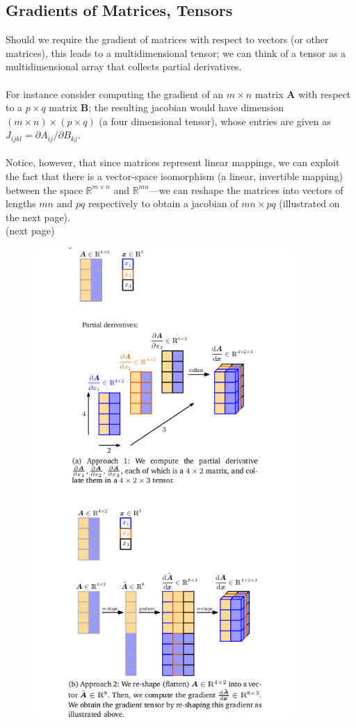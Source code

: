 \documentclass{report}
\begin{document}
\subsection{Gradients of Matrices, Tensors}%
Should we require the gradient of matrices with respect to vectors (or other matrices), this leads to a multidimensional
tensor; we can think of a tensor as a multidimensional array that collects partial derivatives.\\
\vspace{1mm}\\
For instance consider computing the gradient of an $m\times n$ matrix $\bm{A}$ with respect to a $p\times q$
matrix $\bm{B}$; the resulting jacobian would have dimension
$(m\times n)\times(p\times q)$ (a four dimensional tensor), whose entries are given as 
$J_{ijkl}=\partial A_{ij}/\partial B_{kj}$.\\
\vspace{1mm}\\
Notice, however, that since matrices represent linear mappings, we can exploit the fact that there is a vector-space
isomorphism (a linear, invertible mapping) between the space
$\mathbb{R}^{m\times n}$ and $\mathbb{R}^{mn}$---we can reshape the matrices into vectors of lengths $mn$ and $pq$
respectively to obtain a jacobian of $mn\times pq$ (illustrated on the next page). \\
(next page)
\newpage
\begin{figure}
\begin{center}
\includegraphics[width=10cm]{27}\\
\end{center}
\end{figure}
\end{document}
